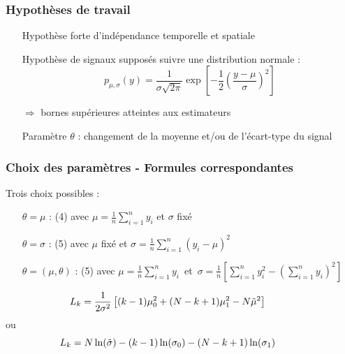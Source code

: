 \documentclass{beamer}
\begin{document}
\begin{frame}
	\frametitle{Hypothèses de travail}
	
	\begin{itemize}
		\item[Hypothèse] forte d'indépendance temporelle et spatiale
		\item[Hypothèse] de signaux supposés suivre une distribution normale :
	\begin{equation}
		p_{\mu, \sigma}(y) = \frac1{\sigma\sqrt{2 \pi}} \exp \left[ -\frac12 \left( \frac{y - \mu}{\sigma} \right)^2 \right]
	\end{equation}
		\item[$\Longrightarrow$] bornes supérieures atteintes aux estimateurs
		\vspace{.4cm}
		\item[Paramètre] $\theta$ : changement de la moyenne et/ou de l'écart-type du signal
	\end{itemize}
\end{frame}

\begin{frame}
	\frametitle{Choix des paramètres - Formules correspondantes}
	Trois choix possibles :
	\vspace*{.3cm}
	\begin{itemize}
		\item[$\theta=\mu$]: (4) avec $\mu=\frac1n\sum_{i=1}^ny_i$ et $\sigma$ fixé
		\vspace*{.2cm}
		\item[$\theta=\sigma$]:  (5) avec $\mu$ fixé et $\sigma=\frac1n\sum_{i=1}^n(y_i-\mu)^2$
		\vspace*{.2cm}
		\item[$\theta=(\mu,\theta)$]: (5) avec \mbox{$\mu=\frac1n\sum_{i=1}^ny_i$ et $\sigma=\frac1n\left[\sum_{i=1}^ny_i^2-(\sum_{i=1}^ny_i)^2\right]$}
	\end{itemize}
	\vspace*{0.8cm}
	\begin{equation}
	\hspace{-1cm}	L_k=\frac 1{2\sigma^2}\left[(k-1)\mu_0^2+(N-k+1)\mu_1^2-N\tilde\mu^2\right]
	\end{equation}
	ou
	\begin{equation}
	\hspace{-1cm}	L_k=N\ln(\tilde\sigma)-(k-1)\ln(\sigma_0)-(N-k+1)\ln(\sigma_1)
	\end{equation}
\end{frame}
\end{document}

